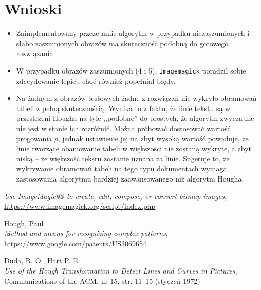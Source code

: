 \documentclass[10pt]{article} %
\begin{document}
\section{Wnioski}
\begin{itemize}
\item Zaimplementowany przeze mnie algorytm w przypadku niezaszumionych i słabo zaszumionych obrazów ma skuteczność podobną do gotowego rozwiązania. 
\item W przypadku obrazów zaszumionych (4 i 5), \texttt{Imagemagick} poradził sobie zdecydowanie lepiej, choć również popełniał błędy. 
\item Na żadnym z obrazów testowych żadne z rozwiązań nie wykryło obramowań tabeli z pełną skutecznością. Wynika to z faktu, że linie tekstu są w przestrzeni Hougha na tyle ,,podobne'' do prostych, że algorytm zwyczajnie nie jest w stanie ich rozróżnić. Można próbować dostosować wartość progowania $p$, jednak ustawienie jej na zbyt wysoką wartość powoduje, że linie tworzące obamowanie tabeli w większości nie zostaną wykryte, a zbyt niską -- że większość tekstu zostanie uznana za linie. Sugeruje to, że wykrywanie obramowań tabeli na tego typu dokumentach wymaga zastosowania algorytmu bardziej zaawansowanego niż algorytm Hougha.
\end{itemize}

\begin{thebibliography}{9}

  \textit{Use ImageMagick® to create, edit, compose, or convert bitmap images},
   \href{https://www.imagemagick.org/script/index.php}{https://www.imagemagick.org/script/index.php}

  Hough, Paul\\
  \textit{Method and means for recognizing complex patterns}, 
  \href{https://www.google.com/patents/US3069654}{https://www.google.com/patents/US3069654}
  
  Duda, R. O., Hart P. E.\\
  \textit{Use of the Hough Transformation to Detect Lines and Curves in Pictures},  \\
  Communications of the ACM, nr 15, str. 11–15 (styczeń 1972)
 
\end{thebibliography}
\end{document}
